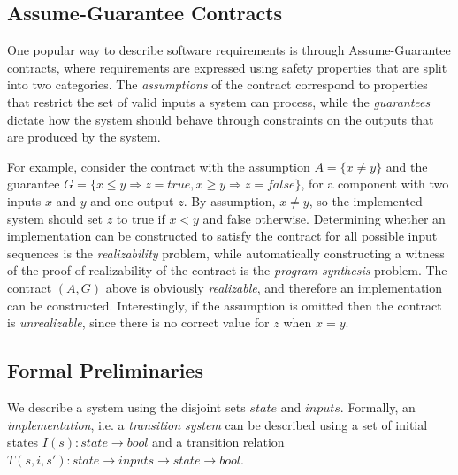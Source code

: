 \subsection{Assume-Guarantee Contracts}

One popular way to describe software requirements is through Assume-Guarantee contracts, where requirements are expressed using safety properties that are split into two categories. The \emph{assumptions} of the contract correspond to properties that restrict the set of valid inputs a system can process, while the \emph{guarantees} dictate how the system should behave through constraints on the outputs that are produced by the system.

For example, consider the contract with the assumption $A = \{x\neq
y\}$ and the guarantee $G = \{x \leq y \Rightarrow z =
\textit{true}, x \geq y \Rightarrow z = \textit{false}\}$, for a component with two inputs $x$ and $y$ and one output $z$.  By assumption, $x \neq y$, so the implemented system should set $z$ to true if $x < y$ and false otherwise.  %
%
Determining whether an implementation can be constructed to satisfy the contract for all possible input sequences is the \emph{realizability} problem, while automatically constructing a witness of the proof of
realizability of the contract is the \emph{program synthesis} problem.  The contract $(A,G)$ above is obviously \emph{realizable}, and therefore an implementation can be constructed.
Interestingly, if the assumption is omitted then the contract is \emph{unrealizable}, since there is no correct value for $z$ when $x=y$.

\subsection{Formal Preliminaries}
\label{sec:pre}

We describe a system using the disjoint sets $state$ and $inputs$. Formally, an \emph{implementation}, i.e. a \emph{transition system} can be described using a set of initial states $I(s) : state \rightarrow bool$ and a transition relation $T(s,i,s'): state \rightarrow inputs \rightarrow state \rightarrow bool$.

